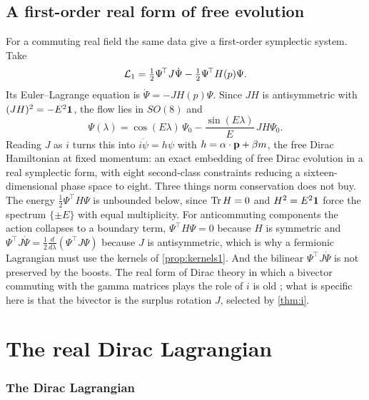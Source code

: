 \subsection{A first-order real form of free evolution}

\label{sec:firstorder}
For a commuting real field the same data give a first-order symplectic system. Take
\[
\mathcal L_1=\tfrac12\Psi^{\!\top}J\dot\Psi-\tfrac12\Psi^{\!\top}H(p)\Psi .
\]
Its Euler--Lagrange equation is $\dot\Psi=-JH(p)\Psi$. Since $JH$ is antisymmetric with $(JH)^2=-E^2\mathbf 1$, the flow lies in $SO(8)$ and
\[
\Psi(\lambda)=\cos(E\lambda)\,\Psi_0-\frac{\sin(E\lambda)}{E}\,JH\Psi_0 .
\]
Reading $J$ as $i$ turns this into $i\dot\psi=h\psi$ with $h=\alpha\cdot\mathbf p+\beta m$, the free Dirac Hamiltonian at fixed momentum: an exact
embedding of free Dirac evolution in a real symplectic form, with eight second-class constraints reducing a sixteen-dimensional phase
space to eight. Three things norm conservation does not buy. The energy $\tfrac12\Psi^{\!\top}H\Psi$ is unbounded below, since $\operatorname{Tr} H=0$
and $H^2=E^2\mathbf 1$ force the spectrum $\{\pm E\}$ with equal multiplicity. For anticommuting components the action collapses to a boundary
term, $\Psi^{\!\top}H\Psi=0$ because $H$ is symmetric and $\Psi^{\!\top}J\dot\Psi=\tfrac12\tfrac{d}{d\lambda}(\Psi^{\!\top}J\Psi)$ because $J$ is
antisymmetric, which is why a fermionic Lagrangian must use the kernels of \cref{prop:kernels1}. And the bilinear $\Psi^{\!\top}J\dot\Psi$
is not preserved by the boosts. The real form of Dirac theory in which a bivector commuting with the gamma matrices plays the role of $i$
is old \cite{Hestenes67}; what is specific here is that the bivector is the surplus rotation $J$, selected by \cref{thm:i}.

\section{The real Dirac Lagrangian}
\label{sec:w:therealdiraclagrangian}

\subsubsection{The Dirac Lagrangian}
\label{r1:sec:dirac}


